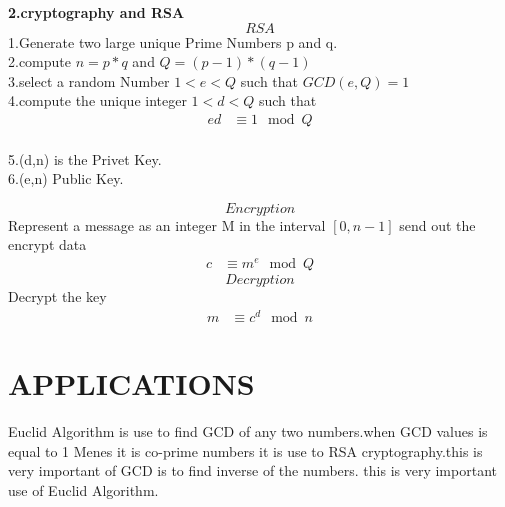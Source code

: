 \documentclass[12pt]{article}
\begin{document}
\textbf{2.cryptography and RSA} ~\cite{3}
  $$RSA$$
1.Generate two large unique Prime Numbers p and q.\\
2.compute $ n = p*q $ and $ Q = (p-1)*(q-1) $\\
3.select a random Number $ 1 < e < Q $ such that $ GCD(e,Q) =1 $\\
4.compute the unique integer $ 1< d < Q $ such that
 \begin{align*}
     ed &\equiv 1\mod Q  
 \end{align*}
 \\
5.(d,n) is the Privet Key.\\
6.(e,n) Public Key.

  $$ Encryption $$
  Represent a message as an integer M in the interval $[0,n-1]$ send out the encrypt data 
   \begin{align*}
     c &\equiv m^e\mod Q  
 \end{align*}
   $$ Decryption $$
   Decrypt the key
    \begin{align*}
     m &\equiv c^d\mod n  
 \end{align*}
  


\section{\textcolor{BurntOrange}{APPLICATIONS}}
\textsf
Euclid Algorithm is use to find GCD of any two numbers.when GCD values is equal to 1 Menes it is co-prime numbers it is use to RSA cryptography.this is very important of GCD is to find inverse of the numbers. this is very important use of Euclid Algorithm.
\\\\\



\end{document}
